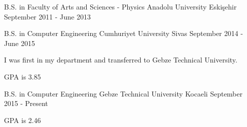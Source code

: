 \begin{cventries}

    \cventry
    {B.S. in Faculty of Arts and Sciences - Physics}
    {Anadolu University}
    {Eskişehir}
    {September 2011 - June 2013}
    {}
    
    \cventry
    {B.S. in Computer Engineering}
    {Cumhuriyet University}
    {Sivas}
    {September 2014 - June 2015}
    {
        \begin{cvitems}
            \item {I was first in my department and transferred to Gebze Technical University.}
            \item {GPA is 3.85}
        \end{cvitems}
    }
    
    \cventry
    {B.S. in Computer Engineering}
    {Gebze Technical University}
    {Kocaeli}
    {September 2015 - Present}
    {
        \begin{cvitems}
            \item {GPA is 2.46}
        \end{cvitems}
    }
    
\end{cventries}
